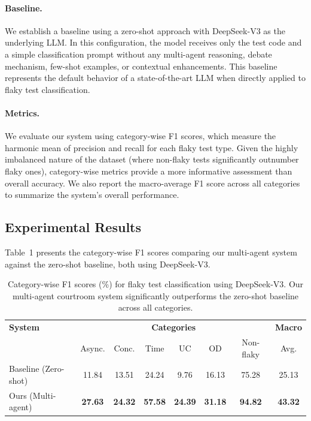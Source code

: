 \documentclass{article}
\begin{document}
\paragraph{Baseline.} We establish a baseline using a zero-shot approach with DeepSeek-V3 as the underlying LLM. In this configuration, the model receives only the test code and a simple classification prompt without any multi-agent reasoning, debate mechanism, few-shot examples, or contextual enhancements. This baseline represents the default behavior of a state-of-the-art LLM when directly applied to flaky test classification.

\paragraph{Metrics.} We evaluate our system using category-wise F1 scores, which measure the harmonic mean of precision and recall for each flaky test type. Given the highly imbalanced nature of the dataset (where non-flaky tests significantly outnumber flaky ones), category-wise metrics provide a more informative assessment than overall accuracy. We also report the macro-average F1 score across all categories to summarize the system's overall performance.

\subsection{Experimental Results}

Table~1 presents the category-wise F1 scores comparing our multi-agent system against the zero-shot baseline, both using DeepSeek-V3.

\begin{table}[h]
\centering
\begin{tabular}{l|cccccc|c}
\hline
\textbf{System} & \multicolumn{6}{c|}{\textbf{Categories}} & \textbf{Macro} \\
 & Async. & Conc. & Time & UC & OD & Non-flaky & Avg. \\
\hline
Baseline (Zero-shot) & 11.84 & 13.51 & 24.24 & 9.76 & 16.13 & 75.28 & 25.13 \\
Ours (Multi-agent) & \textbf{27.63} & \textbf{24.32} & \textbf{57.58} & \textbf{24.39} & \textbf{31.18} & \textbf{94.82} & \textbf{43.32} \\
\hline
\end{tabular}
\caption{Category-wise F1 scores (\%) for flaky test classification using DeepSeek-V3. Our multi-agent courtroom system significantly outperforms the zero-shot baseline across all categories.}
\end{table}
\end{document}
